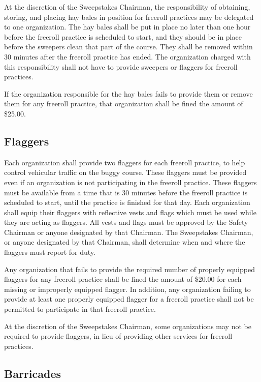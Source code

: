 	At the discretion of the Sweepstakes Chairman, the responsibility of obtaining,
	storing, and placing hay bales in position for freeroll practices may be
	delegated to one organization. The hay bales shall be put in place no later
	than one hour before the freeroll practice is scheduled to start, and they
	should be in place before the sweepers clean that part of the course. They
	shall be removed within 30 minutes after the freeroll practice has ended. The
	organization charged with this responsibility shall not have to provide
	sweepers or flaggers for freeroll practices.

	If the organization responsible for the hay bales fails to provide them or
	remove them for any freeroll practice, that organization shall be fined the
	amount of \$25.00.

\subsection{Flaggers}

	Each organization shall provide two flaggers for each freeroll practice, to
	help control vehicular traffic on the buggy course. These flaggers must be
	provided even if an organization is not participating in the freeroll practice.
	These flaggers must be available from a time that is 30 minutes before the
	freeroll practice is scheduled to start, until the practice is finished for
	that day. Each organization shall equip their flaggers with reflective vests
	and flags which must be used while they are acting as flaggers. All vests and
	flags must be approved by the Safety Chairman or anyone designated by that
	Chairman. The Sweepstakes Chairman, or anyone designated by that Chairman,
	shall determine when and where the flaggers must report for duty.

	Any organization that fails to provide the required number of properly equipped
	flaggers for any freeroll practice shall be fined the amount of \$20.00 for
	each missing or improperly equipped flagger. In addition, any organization
	failing to provide at least one properly equipped flagger for a freeroll
	practice shall not be permitted to participate in that freeroll practice.

	At the discretion of the Sweepstakes Chairman, some organizations may not be
	required to provide flaggers, in lieu of providing other services for freeroll
	practices.

\subsection{Barricades}

